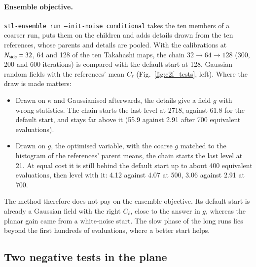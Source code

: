 \paragraph{Ensemble objective.} \texttt{stl-ensemble run --init-noise conditional} takes the ten members of a coarser run, puts them on the children and adds details drawn from the ten references, whose parents and details are pooled. With the calibrations at $N_{\rm side}=32$, 64 and 128 of the ten Takahashi maps, the chain $32\to64\to128$ (300, 200 and 600 iterations) is compared with the default start at 128, Gaussian random fields with the references' mean $C_\ell$ (Fig.~\ref{fig:c2f_tests}, left). Where the draw is made matters:
\begin{itemize}
\item Drawn on $\kappa$ and Gaussianised afterwards, the details give a field $g$ with wrong statistics. The chain starts the last level at 2718, against 61.8 for the default start, and stays far above it (55.9 against 2.91 after 700 equivalent evaluations).
\item Drawn on $g$, the optimised variable, with the coarse $g$ matched to the histogram of the references' parent means, the chain starts the last level at 21. At equal cost it is still behind the default start up to about 400 equivalent evaluations, then level with it: 4.12 against 4.07 at 500, 3.06 against 2.91 at 700.
\end{itemize}
The method therefore does not pay on the ensemble objective. Its default start is already a Gaussian field with the right $C_\ell$, close to the answer in $g$, whereas the planar gain came from a white-noise start. The slow phase of the long runs lies beyond the first hundreds of evaluations, where a better start helps.

\subsection{Two negative tests in the plane}
\label{app:c2f_negative}

